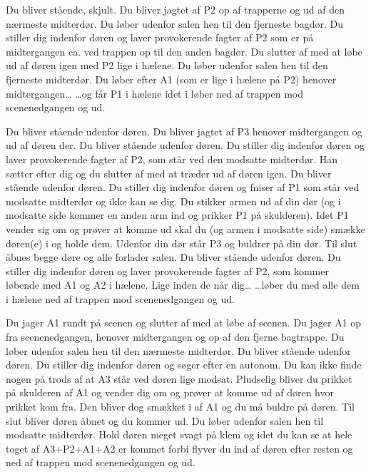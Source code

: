 \documentclass[a4paper,11pt]{article}
\begin{document}
\begin{sketch}
\newpage
{}


 Du bliver stående, skjult.
 Du bliver jagtet af P2 op af trapperne og ud af den nærmeste midterdør.
 Du løber udenfor salen hen til den fjerneste bagdør.
 Du stiller dig indenfor døren og laver provokerende fagter af P2 som er på midtergangen ca. ved trappen op til den anden bagdør. Du slutter af med at løbe ud af døren igen med P2 lige i hælene.
 Du løber udenfor salen hen til den fjerneste midterdør.
 Du løber efter A1 (som er lige i hælene på P2) henover midtergangen\dots{}
 \dots{}og får P1 i hælene idet i løber ned af trappen mod scenenedgangen og ud.


\newpage
{}


 Du bliver stående udenfor døren.
 Du bliver jagtet af P3 henover midtergangen og ud af døren der.
 Du bliver stående udenfor døren.
 Du stiller dig indenfor døren og laver provokerende fagter af P2, som står ved den modsatte midterdør. Han sætter efter dig og du slutter af med at træder ud af døren igen.
 Du bliver stående udenfor døren.
 Du stiller dig indenfor døren og fniser af P1 som står ved modsatte midterdør og ikke kan se dig. Du stikker armen ud af din dør (og i modsatte side kommer en anden arm ind og prikker P1 på skulderen). Idet P1 vender sig om og prøver at komme ud skal du (og armen i modsatte side) smække døren(e) i og holde dem. Udenfor din dør står P3 og buldrer på din dør. Til slut åbnes begge døre og alle forlader salen.
 Du bliver stående udenfor døren.
 Du stiller dig indenfor døren og laver provokerende fagter af P2, som kommer løbende med A1 og A2 i hælene. Lige inden de når dig\dots{}
 \dots{}løber du med alle dem i hælene ned af trappen mod scenenedgangen og ud.


\newpage
{}


 Du jager A1 rundt på scenen og slutter af med at løbe af scenen.
 Du jager A1 op fra scenenedgangen, henover midtergangen og op af den fjerne bagtrappe.
 Du løber udenfor salen hen til den nærmeste midterdør.
 Du bliver stående udenfor døren.
 Du stiller dig indenfor døren og søger efter en autonom. Du kan ikke finde nogen på trods af at A3 står ved døren lige modsat. Pludselig bliver du prikket på skulderen af A1 og vender dig om og prøver at komme ud af døren hvor prikket kom fra. Den bliver dog smækket i af A1 og du må buldre på døren. Til slut bliver døren åbnet og du kommer ud.
 Du løber udenfor salen hen til modsatte midterdør.
 Hold døren meget svagt på klem og idet du kan se at hele toget af A3+P2+A1+A2 er kommet forbi flyver du ind af døren efter resten og ned af trappen mod scenenedgangen og ud.



\end{sketch}
\end{document}
